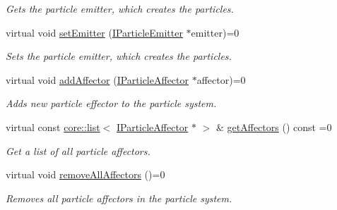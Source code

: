 \begin{DoxyCompactItemize}
\begin{DoxyCompactList}\small\item\em Gets the particle emitter, which creates the particles. \end{DoxyCompactList}\item 
virtual void \hyperlink{classirr_1_1scene_1_1IParticleSystemSceneNode_aececff4531482ce976f1859c40bf3f76}{set\+Emitter} (\hyperlink{classirr_1_1scene_1_1IParticleEmitter}{I\+Particle\+Emitter} $\ast$emitter)=0
\begin{DoxyCompactList}\small\item\em Sets the particle emitter, which creates the particles. \end{DoxyCompactList}\item 
virtual void \hyperlink{classirr_1_1scene_1_1IParticleSystemSceneNode_a401f5afbbb748878011c5ceb7d447f8b}{add\+Affector} (\hyperlink{classirr_1_1scene_1_1IParticleAffector}{I\+Particle\+Affector} $\ast$affector)=0
\begin{DoxyCompactList}\small\item\em Adds new particle effector to the particle system. \end{DoxyCompactList}\item 
virtual const \hyperlink{classirr_1_1core_1_1list}{core\+::list}$<$ \hyperlink{classirr_1_1scene_1_1IParticleAffector}{I\+Particle\+Affector} $\ast$ $>$ \& \hyperlink{classirr_1_1scene_1_1IParticleSystemSceneNode_a3a9159e6ec5869814fdf879c5a7c41a3}{get\+Affectors} () const =0
\begin{DoxyCompactList}\small\item\em Get a list of all particle affectors. \end{DoxyCompactList}\item 
\mbox{\label{classirr_1_1scene_1_1IParticleSystemSceneNode_a96df4c07ee0c480cc2e51e157be308c6}} 
virtual void \hyperlink{classirr_1_1scene_1_1IParticleSystemSceneNode_a96df4c07ee0c480cc2e51e157be308c6}{remove\+All\+Affectors} ()=0
\begin{DoxyCompactList}\small\item\em Removes all particle affectors in the particle system. \end{DoxyCompactList}\item 

\end{DoxyCompactItemize}
